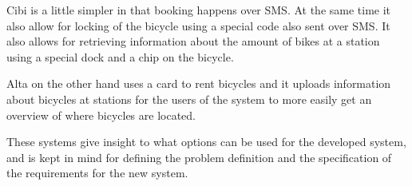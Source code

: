 Cibi is a little simpler in that booking happens over SMS.
At the same time it also allow for locking of the bicycle using a special code also sent over SMS.
It also allows for retrieving information about the amount of bikes at a station using a special dock and a chip on the bicycle.

Alta on the other hand uses a card to rent bicycles and it uploads information about bicycles at stations for the users of the system to more easily get an overview of where bicycles are located.

These systems give insight to what options can be used for the developed system, and is kept in mind for defining the problem definition and the specification of the requirements for the new system.

